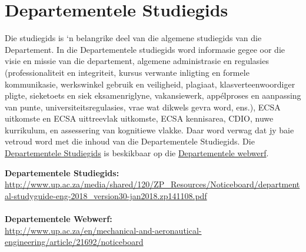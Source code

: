 \section{Departementele Studiegids}\label{sec:department}
    Die studiegids is `n belangrike deel van die algemene studiegids van die
    Departement. In die Departementele studiegids word informasie gegee oor die
    visie en missie van die departement, algemene administrasie en regulasies
    (professionaliteit en integriteit, kursus verwante inligting en formele
    kommunikasie, werkswinkel gebruik en veiligheid, plagiaat,
    klasverteenwoordiger pligte, sieketoets en siek eksamenriglyne,
    vakansiewerk, app\'{e}lproses en aanpassing van punte,
    universiteitsregulasies, vrae wat dikwels gevra word, ens.), ECSA uitkomste
    en ECSA uittreevlak uitkomste, ECSA kennisarea, CDIO, nuwe kurrikulum, en
    assessering van kognitiewe vlakke.  Daar word verwag dat jy baie vetroud
    word met die inhoud van die Departementele Studiegids.
    Die
    \href{http://www.up.ac.za/media/shared/120/ZP_Resources/Noticeboard/departmental-studyguide-eng-2018_version30-jan2018.zp141108.pdf}{Departementele Studiegids}
    is beskikbaar op die
    \href{http://www.up.ac.za/en/mechanical-and-aeronautical-engineering/article/21692/noticeboard}{Departementele webwerf}.


    \noindent
    \textbf{Departementele Studiegids:} \\
    \url{http://www.up.ac.za/media/shared/120/ZP_Resources/Noticeboard/departmental-studyguide-eng-2018_version30-jan2018.zp141108.pdf} \\~\\
    \textbf{Departementele Webwerf:} \\
    \url{http://www.up.ac.za/en/mechanical-and-aeronautical-engineering/article/21692/noticeboard} \\~\\

